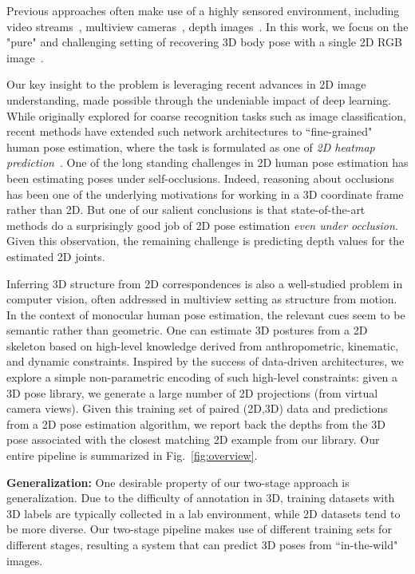 \documentclass[10pt,twocolumn,letterpaper]{article}
\begin{document}
Previous approaches often make use of a highly sensored environment, including video streams~\cite{Zhou_2016_CVPR,Tekin_2016_CVPR}, multiview cameras~\cite{amin2013multi,hofmann2012multi}, depth images~\cite{rafi2015semantic,yub2015random,shotton2013real}. In this work, we focus on the "pure" and challenging setting of recovering 3D body pose with a single 2D RGB image~\cite{li20143d,Yasin_2016_CVPR,rogez2016mocap,wang2014robust}.

Our key insight to the problem is leveraging recent advances in 2D image understanding, made possible through the undeniable impact of deep learning. While originally explored for coarse recognition tasks such as image classification, recent methods have extended such network architectures to ``fine-grained" human pose estimation, where the task is formulated as one of {\em 2D heatmap prediction}~\cite{Wei_2016_CVPR,newell2016stacked,tompson2014joint,hu2015bottom}. One of the long standing challenges in 2D human pose estimation has been estimating poses under self-occlusions. Indeed, reasoning about occlusions has been one of the underlying motivations for working in a 3D coordinate frame rather than 2D. But one of our salient conclusions is that state-of-the-art methods do a surprisingly good job of 2D pose estimation {\em even under occlusion}. Given this observation, the remaining challenge is predicting depth values for the estimated 2D joints.

Inferring 3D structure from 2D correspondences is also a well-studied problem in computer vision, often addressed in multiview setting as structure from motion. In the context of monocular human pose estimation, the relevant cues seem to be semantic rather than geometric. One can estimate 3D postures from a 2D skeleton based on high-level knowledge derived from anthropometric, kinematic, and dynamic constraints. Inspired by the success of data-driven architectures, we explore a simple non-parametric encoding of such high-level constraints: given a 3D pose library, we generate a large number of 2D projections (from virtual camera views). Given this training set of paired (2D,3D) data and predictions from a 2D pose estimation algorithm, we report back the depths from the 3D pose associated with the closest matching 2D example from our library. Our entire pipeline is summarized in Fig.~\ref{fig:overview}. 



{\bf Generalization:} One desirable property of our two-stage approach is generalization. Due to the difficulty of annotation in 3D, training datasets with 3D labels are typically collected in a lab environment, while 2D datasets tend to be more diverse. Our two-stage pipeline makes use of different training sets for different stages, resulting a system that can predict 3D poses from ``in-the-wild" images.
\end{document}
